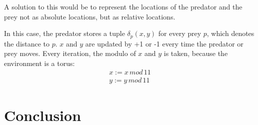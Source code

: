 \documentclass{article}
\begin{document}
A solution to this would be to represent the locations of the predator and the prey not as absolute locations, but as relative locations.

In this case, the predator stores a tuple $\delta_{p}(x,y)$ for every prey $p$, which denotes the distance to $p$. $x$ and $y$ are updated by +1 or -1 every time the predator or prey moves. Every iteration, the modulo of $x$ and $y$ is taken, because the environment is a torus:
\begin{align}
x := x\,mod\,11\\
y := y\,mod\,11
\end{align}

\section{Conclusion}
\end{document}
